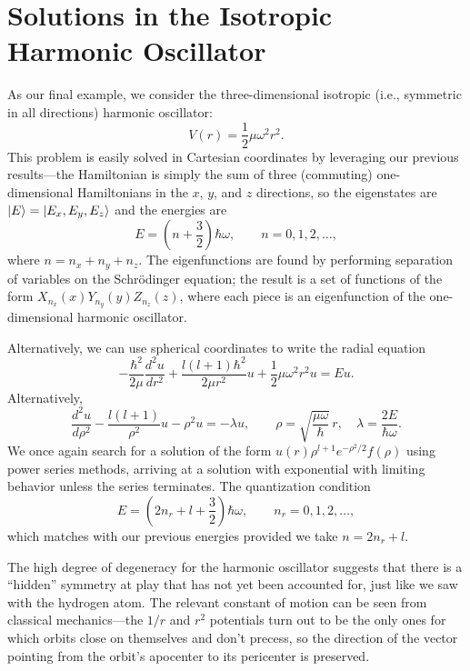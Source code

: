\documentclass[../p116main.tex]{subfiles}
\begin{document}
\section{Solutions in the Isotropic Harmonic Oscillator}
As our final example, we consider the three-dimensional isotropic (i.e., symmetric in all directions) harmonic oscillator:
\[ V(r) = \frac{1}{2} \mu \omega^2 r^2. \]
This problem is easily solved in Cartesian coordinates by leveraging our previous results---the Hamiltonian is simply the sum of three (commuting) one-dimensional Hamiltonians in the $x$, $y$, and $z$ directions, so the eigenstates are $\left| E \right> = \left| E_x, E_y, E_z \right>$ and the energies are
\[ E = \left( n + \frac{3}{2} \right) \hbar \omega, \qquad n = 0, 1, 2, \ldots, \]
where $n = n_x + n_y + n_z$.
The eigenfunctions are found by performing separation of variables on the Schrödinger equation; the result is a set of functions of the form $X_{n_x}(x) Y_{n_y}(y) Z_{n_z}(z)$, where each piece is an eigenfunction of the one-dimensional harmonic oscillator.

Alternatively, we can use spherical coordinates to write the radial equation
\[ -\frac{\hbar^2}{2\mu} \frac{d^2u}{dr^2} + \frac{l(l+1)\hbar^2}{2\mu r^2} u + \frac{1}{2} \mu \omega^2 r^2 u = Eu. \]
Alternatively,
\[ \frac{d^2 u}{d\rho^2} - \frac{l(l+1)}{\rho^2} u - \rho^2 u = -\lambda u, \qquad \rho = \sqrt{\frac{\mu \omega}{\hbar}} \,r, \quad \lambda = \frac{2E}{\hbar \omega}. \]
We once again search for a solution of the form $u(r) \rho^{l+1} e^{-\rho^2 / 2} f(\rho)$ using power series methods, arriving at a solution with exponential with limiting behavior unless the series terminates.
The quantization condition
\[ E = \left( 2n_r + l + \frac{3}{2} \right) \hbar \omega, \qquad n_r = 0, 1, 2, \ldots, \]
which matches with our previous energies provided we take $n = 2n_r + l$.

The high degree of degeneracy for the harmonic oscillator suggests that there is a ``hidden'' symmetry at play that has not yet been accounted for, just like we saw with the hydrogen atom.
The relevant constant of motion can be seen from classical mechanics---the $1 / r$ and $r^2$ potentials turn out to be the only ones for which orbits close on themselves and don't precess, so the direction of the vector pointing from the orbit's apocenter to its pericenter is preserved.
\end{document}
